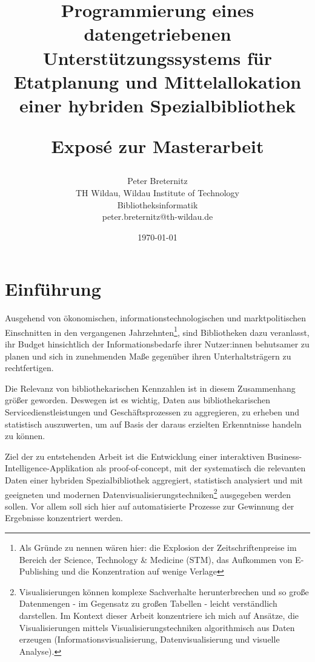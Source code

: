 \documentclass[10pt,a4paper,twocolumn,report]{IEEEtran}
\begin{document}
\title{{Programmierung eines datengetriebenen Unterstützungssystems für
        Etatplanung und Mittelallokation einer hybriden
        Spezialbibliothek}\\
    \begin{large}
        Exposé zur Masterarbeit
    \end{large}}
\author{
	Peter Breternitz \\
	TH Wildau, Wildau Institute of Technology\\ Bibliotheksinformatik \\
	peter.breternitz@th-wildau.de
}


\date{\today}

\maketitle

\section{Einführung}
Ausgehend von ökonomischen, informationstechnologischen und marktpolitischen Einschnitten in den
vergangenen Jahrzehnten\footnote{Als Gründe zu nennen wären hier: die Explosion der Zeitschriftenpreise im Bereich der
Science, Technology \& Medicine (STM), das Aufkommen von E-Publishing und die Konzentration auf wenige
Verlage},
sind Bibliotheken dazu veranlasst, ihr Budget hinsichtlich der Informationsbedarfe
ihrer Nutzer:innen behutsamer zu planen und sich in zunehmenden Maße gegenüber ihren Unterhaltsträgern zu rechtfertigen.

Die Relevanz von bibliothekarischen Kennzahlen ist in diesem Zusammenhang größer geworden.
Deswegen ist es wichtig, Daten aus bibliothekarischen Servicedienstleistungen
und Geschäftsprozessen zu aggregieren, zu erheben und statistisch
auszuwerten, um auf Basis der daraus erzielten Erkenntnisse handeln zu können.

Ziel der zu entstehenden Arbeit ist die Entwicklung einer
interaktiven Business-Intelligence-Applikation als proof-of-concept,
mit der systematisch die relevanten Daten einer hybriden Spezialbibliothek aggregiert, statistisch
analysiert und mit geeigneten und modernen Datenvisualisierungstechniken\footnote{Visualisierungen können komplexe Sachverhalte herunterbrechen und
so große Datenmengen - im Gegensatz zu großen Tabellen - leicht verständlich
darstellen. Im Kontext dieser Arbeit konzentriere ich mich auf Ansätze, die Visualisierungen mittels Visualisierungstechniken algorithmisch aus
Daten erzeugen (Informationsvisualisierung, Datenvisualisierung und visuelle Analyse).\cite{RN100}}
ausgegeben werden sollen.
Vor allem soll sich hier auf automatisierte Prozesse zur Gewinnung der Ergebnisse konzentriert werden.
\end{document}
